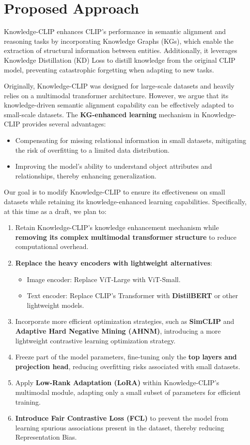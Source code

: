 \documentclass[11pt,letterpaper]{article}
\begin{document}
\section{Proposed Approach}
Knowledge-CLIP enhances CLIP's performance in semantic alignment and reasoning tasks by incorporating Knowledge Graphs (KGs), which enable the extraction of structural information between entities. Additionally, it leverages Knowledge Distillation (KD) Loss to distill knowledge from the original CLIP model, preventing catastrophic forgetting when adapting to new tasks.

Originally, Knowledge-CLIP was designed for large-scale datasets and heavily relies on a multimodal transformer architecture. However, we argue that its knowledge-driven semantic alignment capability can be effectively adapted to small-scale datasets. The \textbf{KG-enhanced learning} mechanism in Knowledge-CLIP provides several advantages:
\begin{itemize}
    \item Compensating for missing relational information in small datasets, mitigating the risk of overfitting to a limited data distribution.
    \item Improving the model’s ability to understand object attributes and relationships, thereby enhancing generalization.
\end{itemize}
Our goal is to modify Knowledge-CLIP to ensure its effectiveness on small datasets while retaining its knowledge-enhanced learning capabilities. Specifically, at this time as a draft, we plan to:
\begin{enumerate}
    \item Retain Knowledge-CLIP’s knowledge enhancement mechanism while\textbf{ removing its complex multimodal transformer structure} to reduce computational overhead.
    \item \textbf{Replace the heavy encoders with lightweight alternatives}:
    \begin{itemize}
        \item Image encoder: Replace ViT-Large with ViT-Small.
        \item Text encoder: Replace CLIP’s Transformer with \textbf{DistilBERT} or other lightweight models.
    \end{itemize}
    \item Incorporate more efficient optimization strategies, such as \textbf{SimCLIP}\cite{liu2024an} and \textbf{Adaptive Hard Negative Mining (AHNM)}, introducing a more lightweight contrastive learning optimization strategy.
    \item Freeze part of the model parameters, fine-tuning only the \textbf{top layers and projection head}, reducing overfitting risks associated with small datasets.
    \item Apply\textbf{ Low-Rank Adaptation (LoRA)} within Knowledge-CLIP’s multimodal module, adapting only a small subset of parameters for efficient training.
    \item \textbf{Introduce Fair Contrastive Loss (FCL)\cite{alabdulmohsin2024clipbiasusefulbalancing}} to prevent the model from learning spurious associations present in the dataset, thereby reducing Representation Bias.
\end{enumerate}
\end{document}
